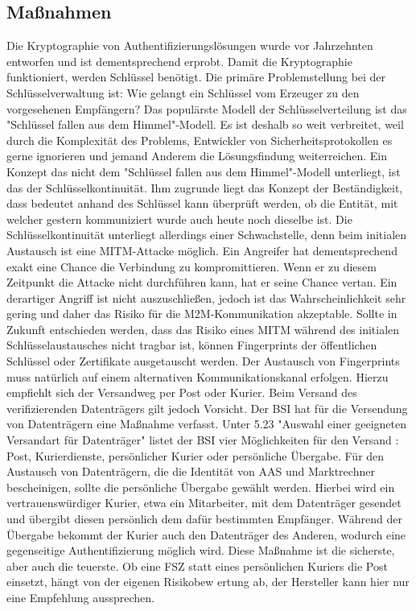\documentclass[11pt,a4paper]{report}
\begin{document}
\subsection{Maßnahmen}

Die Kryptographie von Authentifizierungslösungen wurde vor Jahrzehnten entworfen und ist dementsprechend erprobt. Damit die Kryptographie funktioniert, werden Schlüssel benötigt. Die primäre Problemstellung bei der Schlüsselverwaltung ist: Wie gelangt ein Schlüssel vom Erzeuger zu den vorgesehenen Empfängern? Das populärste Modell der Schlüsselverteilung ist das "Schlüssel fallen aus dem Himmel"-Modell. Es ist deshalb so weit verbreitet, weil durch die Komplexität des Problems, Entwickler von Sicherheitsprotokollen es gerne ignorieren und jemand Anderem die Lösungsfindung weiterreichen. Ein Konzept das nicht dem "Schlüssel fallen aus dem Himmel"-Modell unterliegt, ist das der Schlüsselkontinuität. Ihm zugrunde liegt das Konzept der Beständigkeit, dass bedeutet anhand des Schlüssel kann überprüft werden, ob die Entität, mit welcher gestern kommuniziert wurde auch heute noch dieselbe ist. Die Schlüsselkontinuität unterliegt allerdings einer Schwachstelle, denn beim initialen Austausch ist eine MITM-Attacke möglich. Ein Angreifer hat dementsprechend exakt eine Chance die Verbindung zu kompromittieren. Wenn er zu diesem Zeitpunkt die Attacke nicht durchführen kann, hat er seine Chance vertan. Ein derartiger Angriff ist nicht auszuschließen, jedoch ist das Wahrscheinlichkeit sehr gering und daher das Risiko für die M2M-Kommunikation akzeptable. Sollte in Zukunft entschieden werden, dass das Risiko eines MITM während des initialen Schlüsselaustausches nicht tragbar ist, können Fingerprints der öffentlichen Schlüssel oder Zertifikate ausgetauscht werden. Der Austausch von Fingerprints muss natürlich auf einem alternativen Kommunikationskanal erfolgen. Hierzu empfiehlt sich der Versandweg per Post oder Kurier. Beim Versand des verifizierenden Datenträgers gilt jedoch Vorsicht. Der BSI hat für die Versendung von Datenträgern eine Maßnahme verfasst. Unter 5.23 "Auswahl einer geeigneten Versandart für Datenträger" listet der BSI vier Möglichkeiten für den Versand \cite{bsi_m5023}: Post, Kurierdienste, persönlicher Kurier oder persönliche Übergabe. Für den Austausch von Datenträgern, die die Identität von AAS und Marktrechner bescheinigen, sollte die persönliche Übergabe gewählt werden. Hierbei wird ein vertrauenswürdiger Kurier, etwa ein Mitarbeiter, mit dem Datenträger gesendet und übergibt diesen persönlich dem dafür bestimmten Empfänger. Während der Übergabe bekommt der Kurier auch den Datenträger des Anderen, wodurch eine gegenseitige Authentifizierung möglich wird. Diese Maßnahme ist die sicherste, aber auch die teuerste. Ob eine FSZ statt eines persönlichen Kuriers die Post einsetzt, hängt von der eigenen Risikobew	ertung ab, der Hersteller kann hier nur eine Empfehlung aussprechen.
\end{document}
